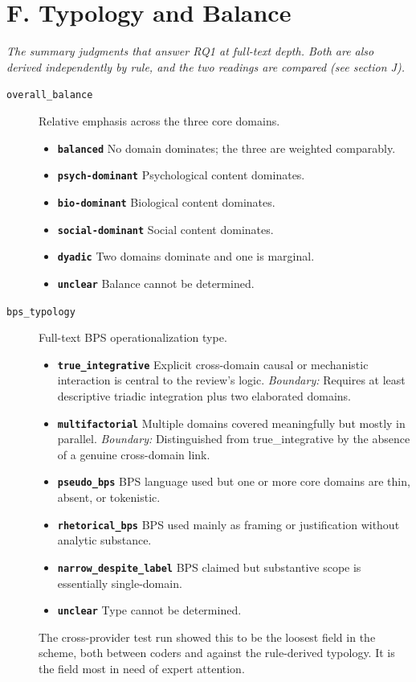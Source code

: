 \documentclass[11pt]{article}
\begin{document}
\section*{F. Typology and Balance}
{\small\itshape The summary judgments that answer RQ1 at full-text depth. Both are also derived independently by rule, and the two readings are compared (see section J).}\par\smallskip
\begin{description}
\item[\texttt{overall\_balance}] Relative emphasis across the three core domains.
  \begin{itemize}[leftmargin=1.3em,itemsep=2pt,topsep=2pt]
  \item \textbf{\texttt{balanced}} No domain dominates; the three are weighted comparably.
  \item \textbf{\texttt{psych-dominant}} Psychological content dominates.
  \item \textbf{\texttt{bio-dominant}} Biological content dominates.
  \item \textbf{\texttt{social-dominant}} Social content dominates.
  \item \textbf{\texttt{dyadic}} Two domains dominate and one is marginal.
  \item \textbf{\texttt{unclear}} Balance cannot be determined.
  \end{itemize}
\item[\texttt{bps\_typology}] Full-text BPS operationalization type.
  \begin{itemize}[leftmargin=1.3em,itemsep=2pt,topsep=2pt]
  \item \textbf{\texttt{true\_integrative}} Explicit cross-domain causal or mechanistic interaction is central to the review's logic. {\small \textit{Boundary:} Requires at least descriptive triadic integration plus two elaborated domains.}
  \item \textbf{\texttt{multifactorial}} Multiple domains covered meaningfully but mostly in parallel. {\small \textit{Boundary:} Distinguished from true\_integrative by the absence of a genuine cross-domain link.}
  \item \textbf{\texttt{pseudo\_bps}} BPS language used but one or more core domains are thin, absent, or tokenistic.
  \item \textbf{\texttt{rhetorical\_bps}} BPS used mainly as framing or justification without analytic substance.
  \item \textbf{\texttt{narrow\_despite\_label}} BPS claimed but substantive scope is essentially single-domain.
  \item \textbf{\texttt{unclear}} Type cannot be determined.
  \end{itemize}
{\small The cross-provider test run showed this to be the loosest field in the scheme, both between coders and against the rule-derived typology. It is the field most in need of expert attention.}
\end{description}
\end{document}
